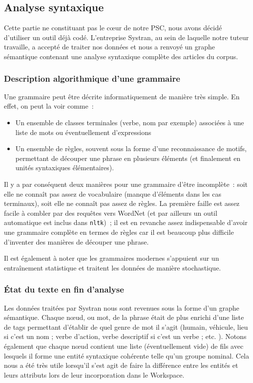 \documentclass[a4paper, 12pt]{article}
\newcommand{\pyt}[1]{\texttt{#1}}%
\begin{document}
\subsection{Analyse syntaxique}

Cette partie ne constituant pas le c\oe{}ur de notre PSC, nous avons décidé d'utiliser un outil déjà codé. L'entreprise Systran, au sein de laquelle notre tuteur travaille, a accepté de traiter nos données et nous a renvoyé un graphe sémantique contenant une analyse syntaxique complète des articles du corpus.

\subsubsection{Description algorithmique d'une grammaire}
Une grammaire peut être décrite informatiquement de manière très simple. En effet, on peut la voir comme~:
\begin{itemize}
	\item Un ensemble de classes terminales (verbe, nom par exemple) associées à une liste de mots ou éventuellement d'expressions
	\item Un ensemble de règles, souvent sous la forme d'une reconnaissance de motifs, permettant de découper une phrase en plusieurs éléments (et finalement en unités syntaxiques élémentaires).
\end{itemize}

Il y a par conséquent deux manières pour une grammaire d'être incomplète~: soit elle ne connaît pas assez de vocabulaire (manque d'éléments dans les cas terminaux), soit elle ne connaît pas assez de règles. La première faille est assez facile à combler par des requêtes vers WordNet (et par ailleurs un outil automatique est inclus dans \pyt{nltk})~; il est en revanche assez indispensable d'avoir une grammaire complète en termes de règles car il est beaucoup plus difficile d'inventer des manières de découper une phrase.

Il est également à noter que les grammaires modernes s'appuient sur un entraînement statistique et traitent les données de manière stochastique.

\subsubsection{\'Etat du texte en fin d'analyse}
Les données traitées par Systran nous sont revenues sous la forme d'un graphe sémantique. Chaque nœud, ou mot, de la phrase était de plus enrichi d'une liste de tags permettant d'établir de quel genre de mot il s'agit (humain, véhicule, lieu si c'est un nom ; verbe d'action, verbe descriptif si c'est un verbe ; etc. ). Notons également que chaque nœud contient une liste (éventuellement vide) de fils avec lesquels il forme une entité syntaxique cohérente telle qu'un groupe nominal. Cela nous a été très utile lorsqu'il s'est agit de faire la différence entre les entités et leurs attributs lors de leur incorporation dans le Workspace.
\end{document}
